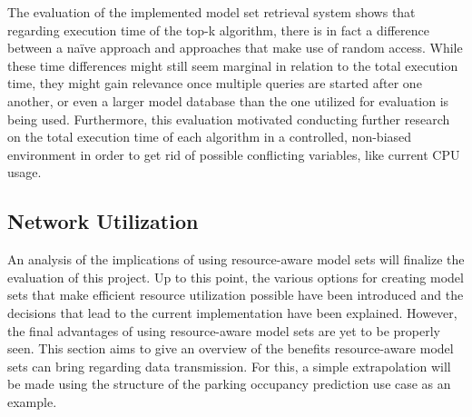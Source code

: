 The evaluation of the implemented model set retrieval system shows that regarding execution time of the top-k algorithm, there is in fact a difference between a naïve approach and approaches that make use of random access. While these time differences might still seem marginal in relation to the total execution time, they might gain relevance once multiple queries are started after one another, or even a larger model database than the one utilized for evaluation is being used. Furthermore, this evaluation motivated conducting further research on the total execution time of each algorithm in a controlled, non-biased environment in order to get rid of possible conflicting variables, like current CPU usage.

  
  
\subsection{Network Utilization}


An analysis of the implications of using resource-aware model sets will finalize the evaluation of this project. Up to this point, the various options for creating model sets that make efficient resource utilization possible have been introduced and the decisions that lead to the current implementation have been explained. However, the final advantages of using resource-aware model sets are yet to be properly seen. This section aims to give an overview of the benefits resource-aware model sets can bring regarding data transmission. For this, a simple extrapolation will be made using the structure of the parking occupancy prediction use case as an example.

